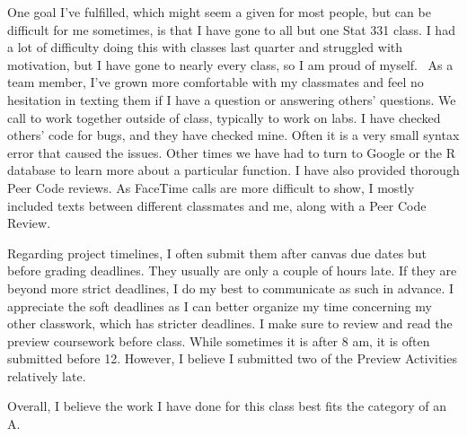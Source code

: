 \documentclass[
  letterpaper,
  DIV=11,
  numbers=noendperiod]{scrartcl}
\begin{document}
One goal I've fulfilled, which might seem a given for most people, but
can be difficult for me sometimes, is that I have gone to all but one
Stat 331 class. I had a lot of difficulty doing this with classes last
quarter and struggled with motivation, but I have gone to nearly every
class, so I am proud of myself.~ As a team member, I've grown more
comfortable with my classmates and feel no hesitation in texting them if
I have a question or answering others' questions. We call to work
together outside of class, typically to work on labs. I have checked
others' code for bugs, and they have checked mine. Often it is a very
small syntax error that caused the issues. Other times we have had to
turn to Google or the R database to learn more about a particular
function. I have also provided thorough Peer Code reviews. As FaceTime
calls are more difficult to show, I mostly included texts between
different classmates and me, along with a Peer Code Review.

Regarding project timelines, I often submit them after canvas due dates
but before grading deadlines. They usually are only a couple of hours
late. If they are beyond more strict deadlines, I do my best to
communicate as such in advance. I appreciate the soft deadlines as I can
better organize my time concerning my other classwork, which has
stricter deadlines. I make sure to review and read the preview
coursework before class. While sometimes it is after 8 am, it is often
submitted before 12. However, I believe I submitted two of the Preview
Activities relatively late.~

Overall, I believe the work I have done for this class best fits the
category of an A.~
\end{document}
